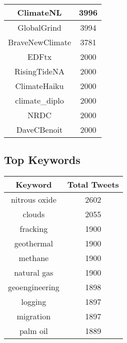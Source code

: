 \documentclass{article}\usepackage[T1]{fontenc}
\begin{document}
\begin{tabular}{|c|c|}
 \hline
ClimateNL & 3996\\ 
 \hline
GlobalGrind & 3994\\ 
 \hline
BraveNewClimate & 3781\\ 
 \hline
EDFtx & 2000\\ 
 \hline
RisingTideNA & 2000\\ 
 \hline
ClimateHaiku & 2000\\ 
 \hline
climate\_diplo & 2000\\ 
 \hline
NRDC & 2000\\ 
 \hline
DaveCBenoit & 2000\\ 
 \hline
\end{tabular}\subsection*{Top Keywords}\begin{tabular}{|c|c|}         \hline         Keyword & Total Tweets \\ 
 \hline
nitrous oxide & 2602\\ 
 \hline
clouds & 2055\\ 
 \hline
fracking & 1900\\ 
 \hline
geothermal & 1900\\ 
 \hline
methane & 1900\\ 
 \hline
natural gas & 1900\\ 
 \hline
geoengineering & 1898\\ 
 \hline
logging & 1897\\ 
 \hline
migration & 1897\\ 
 \hline
palm oil & 1889\\ 
 \hline
\end{tabular}
\end{document}

